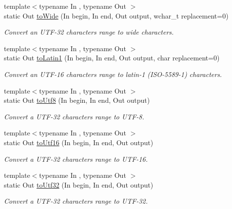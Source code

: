 \begin{DoxyCompactItemize}
{\footnotesize template$<$typename In , typename Out $>$ }\\static Out \hyperlink{classsf_1_1_utf_3_0132_01_4_a0d5bf45a9732beb935592da6bed1242c}{to\-Wide} (In begin, In end, Out output, wchar\-\_\-t replacement=0)
\begin{DoxyCompactList}\small\item\em Convert an U\-T\-F-\/32 characters range to wide characters. \end{DoxyCompactList}\item 
{\footnotesize template$<$typename In , typename Out $>$ }\\static Out \hyperlink{classsf_1_1_utf_3_0132_01_4_a064ce0ad81768d0d99b6b3e2e980e3ce}{to\-Latin1} (In begin, In end, Out output, char replacement=0)
\begin{DoxyCompactList}\small\item\em Convert an U\-T\-F-\/16 characters range to latin-\/1 (I\-S\-O-\/5589-\/1) characters. \end{DoxyCompactList}\item 
{\footnotesize template$<$typename In , typename Out $>$ }\\static Out \hyperlink{classsf_1_1_utf_3_0132_01_4_a193e155964b073c8ba838434f41d5e97}{to\-Utf8} (In begin, In end, Out output)
\begin{DoxyCompactList}\small\item\em Convert a U\-T\-F-\/32 characters range to U\-T\-F-\/8. \end{DoxyCompactList}\item 
{\footnotesize template$<$typename In , typename Out $>$ }\\static Out \hyperlink{classsf_1_1_utf_3_0132_01_4_a3f97efb599ad237af06f076f3fcfa354}{to\-Utf16} (In begin, In end, Out output)
\begin{DoxyCompactList}\small\item\em Convert a U\-T\-F-\/32 characters range to U\-T\-F-\/16. \end{DoxyCompactList}\item 
{\footnotesize template$<$typename In , typename Out $>$ }\\static Out \hyperlink{classsf_1_1_utf_3_0132_01_4_abd7c1e80791c80c4d78257440de96140}{to\-Utf32} (In begin, In end, Out output)
\begin{DoxyCompactList}\small\item\em Convert a U\-T\-F-\/32 characters range to U\-T\-F-\/32. \end{DoxyCompactList}\item 

\end{DoxyCompactItemize}
